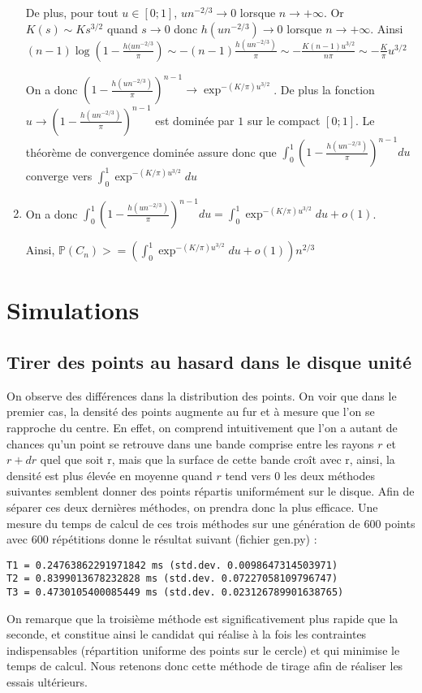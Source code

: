 \documentclass[a4paper,12pt,twoside]{article}
\newcommand{\p}{\mathbb{P}}
\begin{document}
\begin{enumerate}
De plus, pour tout $u \in [0;1]$, $un^{-2/3} \rightarrow 0$ lorsque $n \rightarrow +\infty$.
Or $K(s) \sim Ks^{3/2}$ quand $s \rightarrow 0$ donc $h(un^{-2/3}) \rightarrow 0$ lorsque $n \rightarrow +\infty$. Ainsi $(n-1)\log(1-\frac{h(un^{-2/3}}{\pi}) \sim -(n-1)\frac{h(un^{-2/3})}{\pi} \sim -\frac{K(n-1)u^{3/2}}{n\pi}\sim -\frac{K}{\pi}u^{3/2}$


On a donc $\left(1-\frac{h(un^{-2/3})}{\pi}\right)^{n-1} \rightarrow \exp^{-(K/\pi) u^{3/2}}$. De plus la fonction $ u \rightarrow \left(1-\frac{h(un^{-2/3})}{\pi}\right)^{n-1}$ est dominée par $1$ sur le compact $[0;1]$. Le théorème de convergence dominée assure donc que $\int_0^{1} \left(1-\frac{h(un^{-2/3})}{\pi}\right)^{n-1}du$ converge vers $\int_0^{1} \exp^{-(K/\pi) u^{3/2}}du$

	\item On a donc $\int_0^{1} \left(1-\frac{h(un^{-2/3})}{\pi}\right)^{n-1}du = \int_0^{1} \exp^{-(K/\pi) u^{3/2}}du +o(1)$.
	
	Ainsi, $\p(C_n) >= (\int_0^{1} \exp^{-(K/\pi) u^{3/2}}du +o(1))n^{2/3}$
		\end{enumerate}

\section{Simulations}
	\subsection{Tirer des points au hasard dans le disque unité}
		On observe des différences dans la distribution des points. On voir que dans le premier cas, la densité des points augmente au fur et à mesure que l'on se rapproche du centre. En effet, on comprend intuitivement que l'on a autant de chances qu'un point se retrouve dans une bande comprise entre les rayons $r$ et $r + dr$ quel que soit r, mais que la surface de cette bande croît avec r, ainsi, la densité est plus élevée en moyenne quand $r$ tend vers $0$ les deux méthodes suivantes semblent donner des points répartis uniformément sur le disque.
		Afin de séparer ces deux dernières méthodes, on prendra donc la plus efficace. Une mesure du temps de calcul de ces trois méthodes sur une génération de 600 points avec 600 répétitions donne le résultat suivant (fichier gen.py) : 
		\begin{verbatim}T1 = 0.24763862291971842 ms (std.dev. 0.0098647314503971)
T2 = 0.8399013678232828 ms (std.dev. 0.07227058109796747)
T3 = 0.4730105400085449 ms (std.dev. 0.023126789901638765)
\end{verbatim}
		On remarque que la troisième méthode est significativement plus rapide que la seconde, et constitue ainsi le candidat qui réalise à la fois les contraintes indispensables (répartition uniforme des points sur le cercle) et qui minimise le temps de calcul. Nous retenons donc cette méthode de tirage afin de réaliser les essais ultérieurs.
\end{document}
